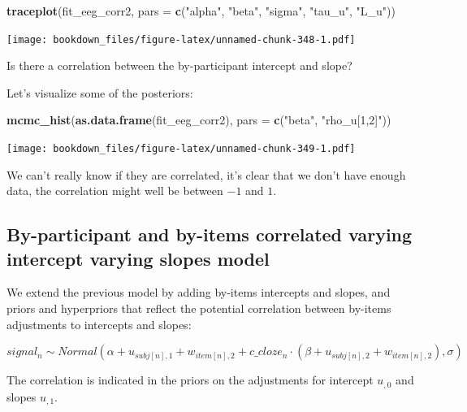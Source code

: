 \documentclass[12pt,]{krantz}
\newenvironment{Shaded}{\begin{snugshade}}{\end{snugshade}}
\newcommand{\KeywordTok}[1]{\textcolor[rgb]{0.13,0.29,0.53}{\textbf{#1}}}
\newcommand{\DataTypeTok}[1]{\textcolor[rgb]{0.13,0.29,0.53}{#1}}
\newcommand{\StringTok}[1]{\textcolor[rgb]{0.31,0.60,0.02}{#1}}
\newcommand{\NormalTok}[1]{#1}
\theoremstyle{definition}
\theoremstyle{definition}
\theoremstyle{definition}
\theoremstyle{remark}
\begin{document}
\begin{Shaded}
\begin{Highlighting}[]
\KeywordTok{traceplot}\NormalTok{(fit_eeg_corr2, }\DataTypeTok{pars =}
                           \KeywordTok{c}\NormalTok{(}\StringTok{"alpha"}\NormalTok{, }\StringTok{"beta"}\NormalTok{, }\StringTok{"sigma"}\NormalTok{, }\StringTok{"tau_u"}\NormalTok{, }\StringTok{"L_u"}\NormalTok{))}
\end{Highlighting}
\end{Shaded}

\texttt{[image: bookdown\_files/figure-latex/unnamed-chunk-348-1.pdf]}

Is there a correlation between the by-participant intercept and slope?

Let's visualize some of the posteriors:

\begin{Shaded}
\begin{Highlighting}[]
\KeywordTok{mcmc_hist}\NormalTok{(}\KeywordTok{as.data.frame}\NormalTok{(fit_eeg_corr2),}
          \DataTypeTok{pars =} \KeywordTok{c}\NormalTok{(}\StringTok{"beta"}\NormalTok{, }\StringTok{"rho_u[1,2]"}\NormalTok{))}
\end{Highlighting}
\end{Shaded}

\texttt{[image: bookdown\_files/figure-latex/unnamed-chunk-349-1.pdf]}

We can't really know if they are correlated, it's clear that we don't
have enough data, the correlation might well be between \(-1\) and
\(1\).

\subsection{By-participant and by-items correlated varying intercept
varying slopes model}\label{sec:crosscorrstan}

We extend the previous model by adding by-items intercepts and slopes,
and priors and hyperpriors that reflect the potential correlation
between by-items adjustments to intercepts and slopes:

\begin{equation}
  signal_n \sim Normal(\alpha + u_{subj[n], 1} + w_{item[n], 2} + c\_cloze_n \cdot  (\beta + u_{subj[n],2} + w_{item[n], 2}),\sigma)
\end{equation}

The correlation is indicated in the priors on the adjustments for
intercept \(u_{,0}\) and slopes \(u_{,1}\).
\end{document}

